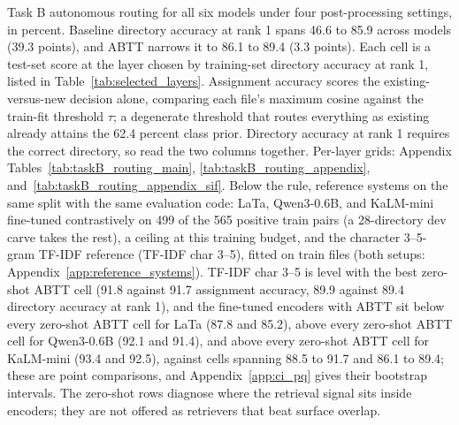 \begin{table}[t]
\caption{Task B autonomous routing for all six models under four post-processing settings, in percent. Baseline directory accuracy at rank 1 spans 46.6 to 85.9 across models (39.3 points), and ABTT narrows it to 86.1 to 89.4 (3.3 points). Each cell is a test-set score at the layer chosen by training-set directory accuracy at rank 1, listed in Table~\ref{tab:selected_layers}. Assignment accuracy scores the existing-versus-new decision alone, comparing each file's maximum cosine against the train-fit threshold $\tau$; a degenerate threshold that routes everything as existing already attains the 62.4 percent class prior. Directory accuracy at rank 1 requires the correct directory, so read the two columns together. Per-layer grids: Appendix Tables~\ref{tab:taskB_routing_main}, \ref{tab:taskB_routing_appendix}, and~\ref{tab:taskB_routing_appendix_sif}. Below the rule, reference systems on the same split with the same evaluation code: LaTa, Qwen3-0.6B, and KaLM-mini fine-tuned contrastively on 499 of the 565 positive train pairs (a 28-directory dev carve takes the rest), a ceiling at this training budget, and the character 3--5-gram TF-IDF reference (TF-IDF char 3--5), fitted on train files (both setups: Appendix~\ref{app:reference_systems}). TF-IDF char 3--5 is level with the best zero-shot ABTT cell (91.8 against 91.7 assignment accuracy, 89.9 against 89.4 directory accuracy at rank 1), and the fine-tuned encoders with ABTT sit below every zero-shot ABTT cell for LaTa (87.8 and 85.2), above every zero-shot ABTT cell for Qwen3-0.6B (92.1 and 91.4), and above every zero-shot ABTT cell for KaLM-mini (93.4 and 92.5), against cells spanning 88.5 to 91.7 and 86.1 to 89.4; these are point comparisons, and Appendix~\ref{app:ci_pq} gives their bootstrap intervals. The zero-shot rows diagnose where the retrieval signal sits inside encoders; they are not offered as retrievers that beat surface overlap.}
\label{tab:taskB_headline}
\end{table}
